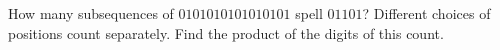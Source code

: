How many subsequences of $0101010101010101$ spell $01101$? Different choices of positions count separately. Find the product of the digits of this count.
